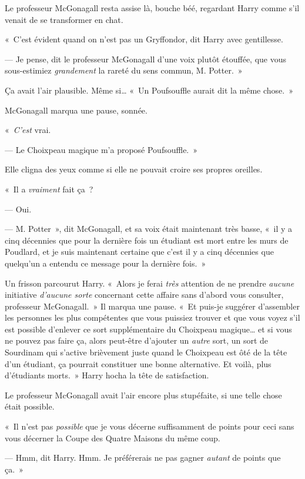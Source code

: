 Le professeur McGonagall resta assise là, bouche béé, regardant Harry comme s'il venait de se transformer en chat.

«~C'est évident quand on n'est pas un Gryffondor, dit Harry avec gentillesse.

--- Je pense, dit le professeur McGonagall d'une voix plutôt étouffée, que vous sous-estimiez \emph{grandement} la rareté du sens commun, M. Potter.~»

Ça avait l'air plausible. Même si… «~Un Poufsouffle aurait dit la même chose.~»

McGonagall marqua une pause, sonnée.

«~\emph{C'est} vrai.

--- Le Choixpeau magique m'a proposé Poufsouffle.~»

Elle cligna des yeux comme si elle ne pouvait croire ses propres oreilles.

«~Il a \emph{vraiment} fait ça~?

--- Oui.

--- M. Potter~», dit McGonagall, et sa voix était maintenant très basse, «~il y a cinq décennies que pour la dernière fois un étudiant est mort entre les murs de Poudlard, et je suis maintenant certaine que c'est il y a cinq décennies que quelqu'un a entendu ce message pour la dernière fois.~»

Un frisson parcourut Harry. «~Alors je ferai \emph{très} attention de ne prendre \emph{aucune} initiative \emph{d'aucune sorte} concernant cette affaire sans d'abord vous consulter, professeur McGonagall.~» Il marqua une pause. «~Et puis-je suggérer d'assembler les personnes les plus compétentes que vous puissiez trouver et que vous voyez s'il est possible d'enlever ce sort supplémentaire du Choixpeau magique… et si vous ne pouvez pas faire ça, alors peut-être d'ajouter un \emph{autre} sort, un sort de Sourdinam qui s'active brièvement juste quand le Choixpeau est ôté de la tête d'un étudiant, ça pourrait constituer une bonne alternative. Et voilà, plus d'étudiants morts.~» Harry hocha la tête de satisfaction.

Le professeur McGonagall avait l'air encore plus stupéfaite, si une telle chose était possible.

«~Il n'est pas \emph{possible} que je vous décerne suffisamment de points pour ceci sans vous décerner la Coupe des Quatre Maisons du même coup.

--- Hmm, dit Harry. Hmm. Je préférerais ne pas gagner \emph{autant} de points que ça.~»

